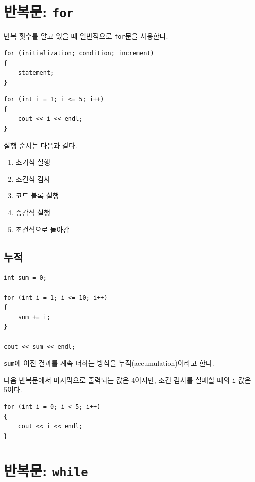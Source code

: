 \documentclass[11pt,a4paper]{article}
\begin{document}
\section{반복문: \texttt{for}}

반복 횟수를 알고 있을 때 일반적으로 \texttt{for}문을 사용한다.

\begin{lstlisting}
for (initialization; condition; increment)
{
    statement;
}
\end{lstlisting}

\begin{lstlisting}
for (int i = 1; i <= 5; i++)
{
    cout << i << endl;
}
\end{lstlisting}

실행 순서는 다음과 같다.

\begin{enumerate}
    \item 초기식 실행
    \item 조건식 검사
    \item 코드 블록 실행
    \item 증감식 실행
    \item 조건식으로 돌아감
\end{enumerate}

\subsection{누적}

\begin{lstlisting}
int sum = 0;

for (int i = 1; i <= 10; i++)
{
    sum += i;
}

cout << sum << endl;
\end{lstlisting}

\texttt{sum}에 이전 결과를 계속 더하는 방식을 누적(accumulation)이라고 한다.

\begin{checkpointbox}
다음 반복문에서 마지막으로 출력되는 값은 4이지만, 조건 검사를 실패할 때의 \texttt{i} 값은 5이다.
\begin{lstlisting}
for (int i = 0; i < 5; i++)
{
    cout << i << endl;
}
\end{lstlisting}
\end{checkpointbox}

\section{반복문: \texttt{while}}
\end{document}

